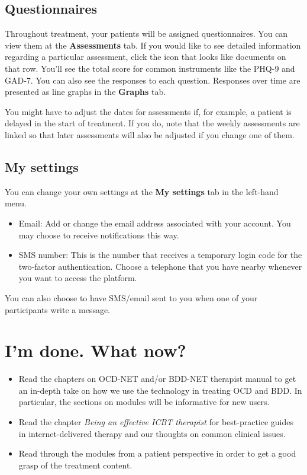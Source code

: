 \documentclass[]{book}
\providecommand{\tightlist}{%
  \setlength{\itemsep}{0pt}\setlength{\parskip}{0pt}}
\begin{document}
\hypertarget{questionnaires}{%
\subsection{Questionnaires}\label{questionnaires}}

Throughout treatment, your patients will be assigned questionnaires. You can view them at the \textbf{Assessments} tab. If you would like to see detailed information regarding a particular assessment, click the icon that looks like documents on that row. You'll see the total score for common instruments like the PHQ-9 and GAD-7. You can also see the responses to each question. Responses over time are presented as line graphs in the \textbf{Graphs} tab.

You might have to adjust the dates for assessments if, for example, a patient is delayed in the start of treatment. If you do, note that the weekly assessments are linked so that later assessments will also be adjusted if you change one of them.

\hypertarget{my-settings}{%
\subsection{My settings}\label{my-settings}}

You can change your own settings at the \textbf{My settings} tab in the left-hand menu.

\begin{itemize}
\tightlist
\item
  Email: Add or change the email address associated with your account. You may choose to receive notifications this way.
\item
  SMS number: This is the number that receives a temporary login code for the two-factor authentication. Choose a telephone that you have nearby whenever you want to access the platform.
\end{itemize}

You can also choose to have SMS/email sent to you when one of your participants write a message.

\hypertarget{im-done.-what-now}{%
\section{I'm done. What now?}\label{im-done.-what-now}}

\begin{itemize}
\tightlist
\item
  Read the chapters on OCD-NET and/or BDD-NET therapist manual to get an in-depth take on how we use the technology in treating OCD and BDD. In particular, the sections on modules will be informative for new users.
\item
  Read the chapter \emph{Being an effective ICBT therapist} for best-practice guides in internet-delivered therapy and our thoughts on common clinical issues.
\item
  Read through the modules from a patient perspective in order to get a good grasp of the treatment content.
\end{itemize}
\end{document}

